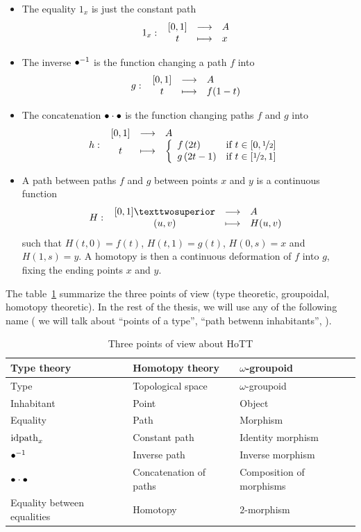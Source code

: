 \begin{itemize}
\item The equality $1_x$ is just the constant path 
  \[ 1_x \, \colon \left. \begin{array}{ccl} [0,1] & \longrightarrow & A \\ t & \longmapsto & x \end{array} \right. \]
\item The inverse $\bullet^{-1}$ is the function changing a path $f$ into
  \[ g \, \colon \left. \begin{array}{ccl} [0,1] & \longrightarrow & A \\ t & \longmapsto & f(1-t) \end{array} \right. \]
\item The concatenation $\bullet\cdot \bullet$ is the function
  changing paths $f$ and $g$ into
\[ \fonction{h}{[0,1]}{A}{t}%
  { \left\{
    \begin{array}{ll}
      f\left(2t\right) &\text{if } t\in[0,\nicefrac12] \\
      g\left(2t-1\right) &\text{if } t\in [\nicefrac12,1] 
    \end{array}
  \right.}
\]
\item A path between paths $f$ and $g$ between points $x$ and $y$ is a
  continuous function
  \[ 
    \fonction{H}{[0,1]²}{A}{(u,v)}{H(u,v)}
  \]
  such that $H(t,0) = f(t)$, $H(t,1) = g(t)$, $H(0,s)=x$ and
  $H(1,s)=y$. 
  A homotopy is then a continuous deformation of $f$ into $g$, fixing
  the ending points $x$ and $y$.
\end{itemize}

The table~\ref{fig:3pw} summarize the three points of view (type
theoretic, groupoidal, homotopy theoretic). In the rest of the thesis,
we will use any of the following name (\eg{} we will talk about
``points of a type'', ``path betwenn inhabitants'', \etc{}).

\begin{table}[h]
  \centering
  \begin{tabular}{|l|l|l|}
    \hline
    Type theory & Homotopy theory & $\omega$-groupoid \\
    \hline \hline
    Type & Topological space & $\omega$-groupoid \\
    \hline
    Inhabitant & Point & Object \\
    \hline
    Equality & Path & Morphism \\
    \hline
    $\mathrm{idpath}_x$ & Constant path & Identity morphism \\
    \hline
    $\bullet^{-1}$ & Inverse path & Inverse morphism \\
    \hline
    $\bullet\cdot \bullet$ & Concatenation of paths & Composition of
                                                       morphisms \\
    \hline
    Equality between equalities & Homotopy & $2$-morphism\\
    \hline
  \end{tabular}
  \caption{Three points of view about HoTT}
  \label{fig:3pw}
\end{table}



